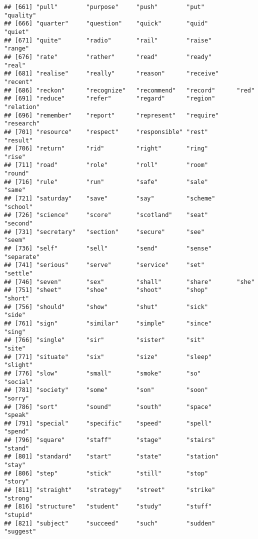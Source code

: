 \documentclass[
]{article}
\begin{document}
\begin{verbatim}
## [661] "pull"        "purpose"     "push"        "put"         "quality"    
## [666] "quarter"     "question"    "quick"       "quid"        "quiet"      
## [671] "quite"       "radio"       "rail"        "raise"       "range"      
## [676] "rate"        "rather"      "read"        "ready"       "real"       
## [681] "realise"     "really"      "reason"      "receive"     "recent"     
## [686] "reckon"      "recognize"   "recommend"   "record"      "red"        
## [691] "reduce"      "refer"       "regard"      "region"      "relation"   
## [696] "remember"    "report"      "represent"   "require"     "research"   
## [701] "resource"    "respect"     "responsible" "rest"        "result"     
## [706] "return"      "rid"         "right"       "ring"        "rise"       
## [711] "road"        "role"        "roll"        "room"        "round"      
## [716] "rule"        "run"         "safe"        "sale"        "same"       
## [721] "saturday"    "save"        "say"         "scheme"      "school"     
## [726] "science"     "score"       "scotland"    "seat"        "second"     
## [731] "secretary"   "section"     "secure"      "see"         "seem"       
## [736] "self"        "sell"        "send"        "sense"       "separate"   
## [741] "serious"     "serve"       "service"     "set"         "settle"     
## [746] "seven"       "sex"         "shall"       "share"       "she"        
## [751] "sheet"       "shoe"        "shoot"       "shop"        "short"      
## [756] "should"      "show"        "shut"        "sick"        "side"       
## [761] "sign"        "similar"     "simple"      "since"       "sing"       
## [766] "single"      "sir"         "sister"      "sit"         "site"       
## [771] "situate"     "six"         "size"        "sleep"       "slight"     
## [776] "slow"        "small"       "smoke"       "so"          "social"     
## [781] "society"     "some"        "son"         "soon"        "sorry"      
## [786] "sort"        "sound"       "south"       "space"       "speak"      
## [791] "special"     "specific"    "speed"       "spell"       "spend"      
## [796] "square"      "staff"       "stage"       "stairs"      "stand"      
## [801] "standard"    "start"       "state"       "station"     "stay"       
## [806] "step"        "stick"       "still"       "stop"        "story"      
## [811] "straight"    "strategy"    "street"      "strike"      "strong"     
## [816] "structure"   "student"     "study"       "stuff"       "stupid"     
## [821] "subject"     "succeed"     "such"        "sudden"      "suggest"    

\end{verbatim}
\end{document}
